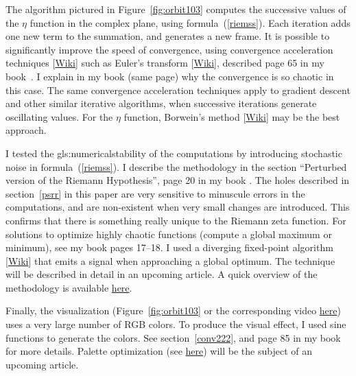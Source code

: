 \documentclass[oneside,10pt]{book}
\begin{document}
The algorithm pictured in Figure~\ref{fig:orbit103} computes the successive values of the $\eta$ function in the complex plane, using
formula~(\ref{riemss}). Each iteration adds one new term to the summation, and generates a new frame. It is possible to
significantly improve the speed of convergence, using \textcolor{index}{convergence acceleration} techniques
[\href{https://en.wikipedia.org/wiki/Series_acceleration}{Wiki}] such as Euler's transform [\href{https://mathworld.wolfram.com/EulerTransform.html}{Wiki}], described page 65 in my book~\cite{vgsimulnew}. I explain in my book (same page)
 why the convergence is so chaotic in this case. The same convergence acceleration techniques apply to gradient descent
 and other similar iterative algorithms, when successive iterations generate oscillating values. For the $\eta$ function,
 Borwein’s method [\href{https://en.wikipedia.org/wiki/Borwein\%27s_algorithm}{Wiki}] may be the best approach.

I tested the \gls{gls:numericalstability} of the computations by introducing stochastic noise in formula~(\ref{riemss}). I describe the methodology in
 the section ``Perturbed version of the Riemann Hypothesis'', page 20 in my book \cite{vgsimulnew}. The holes described in section~\ref{psrr} in this paper are very sensitive to minuscule errors in the computations, and are non-existent when very small changes are introduced. This confirms that there is something really unique to the Riemann zeta function. For solutions to optimize  highly chaotic functions (compute a global maximum or minimum), see my book \cite{vgsimulnew} pages 17--18. I used a diverging
 \textcolor{index}{fixed-point algorithm} [\href{https://en.wikipedia.org/wiki/Fixed-point_iteration}{Wiki}] that emits a signal when approaching a global optimum.
The technique will be described in detail in an upcoming article. A quick overview of the methodology is available \href{https://www.datasciencecentral.com/a-new-machine-learning-optimization-technique-part-i/}{here}.

Finally, the visualization (Figure~\ref{fig:orbit103} or the corresponding video \href{https://www.youtube.com/watch?v=XI5MhyNc7us}{here}) uses a very large number of RGB colors. To produce the visual effect, I used sine functions to generate the colors. See section~\ref{conv222}, and page 85 in my book~\cite{vgsimulnew} for more details.
Palette optimization (see \href{https://mathoverflow.net/questions/415618/lattice-like-structure-with-maximum-spacing-between-vertices}{here}) will be the subject of an upcoming article.
\end{document}
